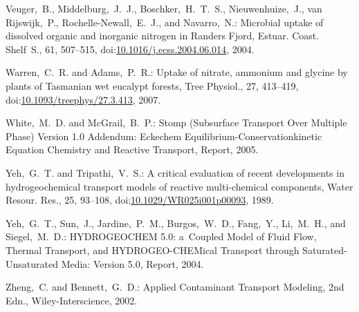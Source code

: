 \documentclass[gmd,noline]{copernicus}
\begin{document}
\begin{thebibliography}{55}
Veuger,~B., Middelburg,~J.~J., Boschker,~H.~T.~S., Nieuwenhuize,~J., van Rijswijk,~P., Rochelle-Newall,~E.~J., and Navarro,~N.:
Microbial uptake of dissolved organic and inorganic nitrogen in Randers Fjord,
Estuar. Coast. Shelf~S.,
61, 507--515,
doi:\href{http://dx.doi.org/10.1016/j.ecss.2004.06.014}{10.1016/j.ecss.2004.06.014}, 2004.


Warren,~C.~R. and Adams,~P.~R.:
Uptake of nitrate, ammonium and glycine by plants of Tasmanian wet eucalypt forests,
Tree Physiol.,
27, 413--419,
doi:\href{http://dx.doi.org/10.1093/treephys/27.3.413}{10.1093/treephys/27.3.413}, 2007.


White,~M.~D. and McGrail,~B.~P.:
Stomp (Subsurface Transport Over Multiple Phase) Version 1.0 Addendum: Eckechem Equilibrium-Conservationkinetic Equation Chemistry and Reactive Transport, Report,
  2005.

Yeh,~G.~T. and Tripathi,~V.~S.:
A critical evaluation of recent developments in hydrogeochemical transport models of reactive multi-chemical components,
Water Resour. Res.,
25, 93--108,
doi:\href{http://dx.doi.org/10.1029/WR025i001p00093}{10.1029/WR025i001p00093}, 1989.


Yeh,~G.~T., Sun,~J., Jardine,~P.~M., Burgos,~W.~D., Fang,~Y., Li,~M.~H., and Siegel,~M.~D.:
HYDROGEOCHEM 5.0: a~Coupled Model of Fluid Flow, Thermal Transport, and HYDROGEO-CHEMical Transport through Saturated-Unsaturated Media: Version 5.0, Report,
  2004.

Zheng,~C. and Bennett,~G.~D.: Applied Contaminant Transport Modeling, 2nd
Edn., Wiley-Interscience, 2002.

\end{thebibliography}
\end{document}
